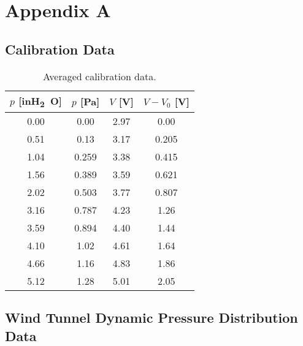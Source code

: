 \chapter{Appendix A}
\section{Calibration Data}

\begin{table}[htpb]
    \caption{Averaged calibration data.}
    \label{tab:calibration_data}
    \centering
    \begin{tabular}{cccc}
        \toprule
        $p$ [\unit{inH_2O}] & $p$ [\unit{\pascal}] & $V$ [\unit{\volt}] & $V - V_0$ [\unit{\volt}] \\
        \midrule
        \num{0.00} & \num{0.00} & \num{2.97} & \num{0.00} \\
        \num{0.51} & \num{0.13} & \num{3.17} & \num{0.205} \\
        \num{1.04} & \num{0.259} & \num{3.38} & \num{0.415} \\
        \num{1.56} & \num{0.389} & \num{3.59} & \num{0.621} \\
        \num{2.02} & \num{0.503} & \num{3.77} & \num{0.807} \\
        \num{3.16} & \num{0.787} & \num{4.23} & \num{1.26} \\
        \num{3.59} & \num{0.894} & \num{4.40} & \num{1.44} \\
        \num{4.10} & \num{1.02} & \num{4.61} & \num{1.64} \\
        \num{4.66} & \num{1.16} & \num{4.83} & \num{1.86} \\
        \num{5.12} & \num{1.28} & \num{5.01} & \num{2.05} \\
        \bottomrule
    \end{tabular}
\end{table}

\newpage

\section{Wind Tunnel Dynamic Pressure Distribution Data}

